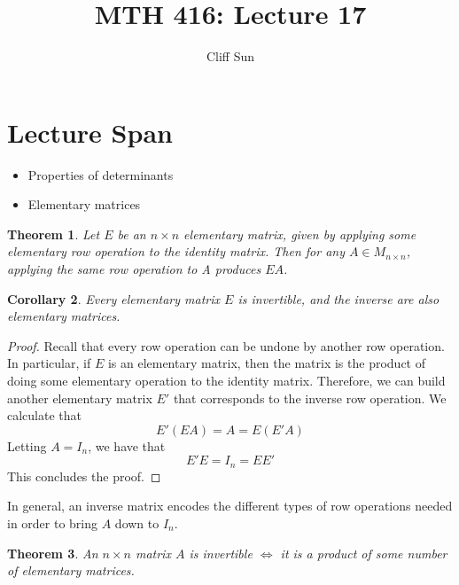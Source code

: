 \documentclass{article}
\title{MTH 416: Lecture 17}
\author{Cliff Sun}
\newtheorem{theorem}{Theorem}[section]
\newtheorem{corollary}[theorem]{Corollary}
\newtheorem{one minute paper}[theorem]{One Minute Paper}
\begin{document}
\maketitle

\section*{Lecture Span}
\begin{itemize}
    \item Properties of determinants
    \item Elementary matrices
\end{itemize}

\begin{theorem}
    Let $E$ be an $n \times n$ elementary matrix, given by applying some elementary row operation to the identity matrix. Then for any $A \in M_{n \times n}$, applying the same 
    row operation to A produces $EA$. 
\end{theorem}

\begin{corollary}
    Every elementary matrix $E$ is invertible, and the inverse are also elementary matrices.
\end{corollary}

\begin{proof}
    Recall that every row operation can be undone by another row operation. In particular, if $E$ is an elementary matrix, then the matrix is the product of doing some elementary operation to the identity matrix. 
    Therefore, we can build another elementary matrix $E'$ that corresponds to the inverse row operation. We calculate that 
    \begin{equation}
        E'(EA) = A = E(E'A)
    \end{equation}
    Letting $A = I_n$, we have that 
    \begin{equation}
        E'E = I_n = EE'
    \end{equation}
    This concludes the proof. 
\end{proof}

In general, an inverse matrix encodes the different types of row operations needed in order to bring $A$ down to $I_n$. 

\begin{theorem}
    An $n \times n$ matrix $A$ is invertible $\iff$ it is a product of some number of elementary matrices. 
\end{theorem}
\end{document}
